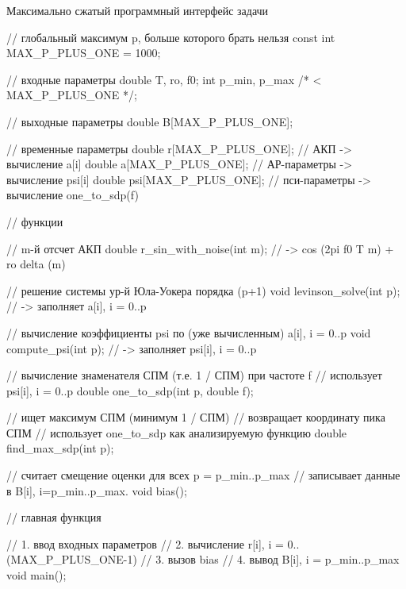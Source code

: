     \begin{listing}
        \caption{Максимально сжатый программный интерфейс задачи}
        \begin{cppcode}

            // глобальный максимум p, больше которого брать нельзя
            const int MAX_P_PLUS_ONE = 1000;

            // входные параметры
            double T, ro, f0;
            int    p_min, p_max /* < MAX_P_PLUS_ONE */;

            // выходные параметры
            double B[MAX_P_PLUS_ONE];

            // временные параметры
            double r[MAX_P_PLUS_ONE];   // АКП -> вычисление a[i]
            double a[MAX_P_PLUS_ONE];   // АР-параметры -> вычисление psi[i]
            double psi[MAX_P_PLUS_ONE]; // пси-параметры -> вычисление one_to_sdp(f)

            // функции

            // m-й отсчет АКП
            double r_sin_with_noise(int m); // -> cos (2pi f0 T m) + ro delta (m)

            // решение системы ур-й Юла-Уокера порядка (p+1)
            void levinson_solve(int p); // -> заполняет a[i], i = 0..p

            // вычисление коэффициенты psi по (уже вычисленным) a[i], i = 0..p
            void compute_psi(int p); // -> заполняет psi[i], i = 0..p

            // вычисление знаменателя СПМ (т.е. 1 / СПМ) при частоте f
            // использует psi[i], i = 0..p
            double one_to_sdp(int p, double f);

            // ищет максимум СПМ (минимум 1 / СПМ)
            // возвращает координату пика СПМ
            // использует one_to_sdp как анализируемую функцию
            double find_max_sdp(int p);

            // считает смещение оценки для всех p = p_min..p_max
            // записывает данные в B[i], i=p_min..p_max.
            void bias();

            // главная функция

            // 1. ввод входных параметров
            // 2. вычисление r[i], i = 0..(MAX_P_PLUS_ONE-1)
            // 3. вызов bias
            // 4. вывод B[i], i = p_min..p_max
            void main();
        \end{cppcode}
    \end{listing}

